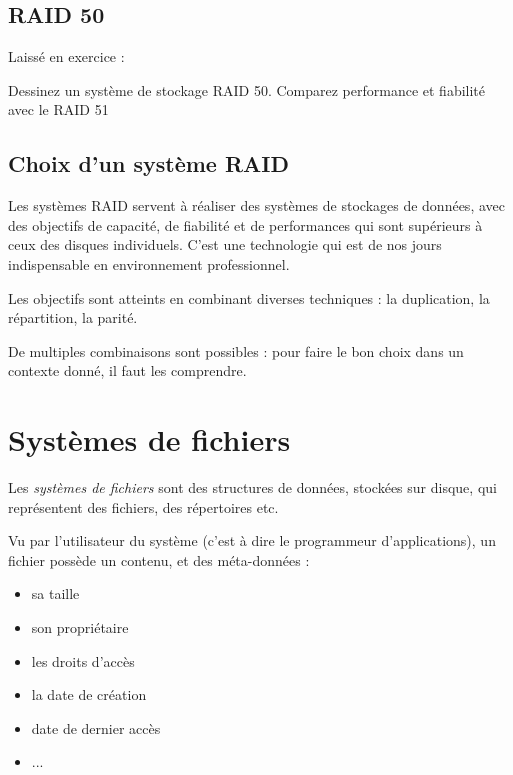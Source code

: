 \begin{multicols}{2}


\subsection{RAID 50}

Laissé en exercice :

\begin{exercice}
Dessinez un système de stockage RAID 50.
Comparez 
 performance et fiabilité avec le RAID 51
\end{exercice}

\subsection{Choix d'un système RAID}

Les systèmes RAID servent à réaliser des systèmes de stockages de
données, avec des objectifs de capacité, de fiabilité et de
performances qui sont supérieurs à ceux des disques individuels.
C'est une technologie qui est de nos jours indispensable en environnement
professionnel.

Les objectifs sont atteints en combinant diverses techniques : la
duplication, la répartition, la parité.

De multiples combinaisons sont possibles : pour faire le bon choix 
dans un contexte donné, il faut les comprendre.



\section{Systèmes de fichiers}

Les \emph{systèmes de fichiers} sont des structures de données,
stockées sur disque, qui représentent des fichiers, des répertoires
etc.

Vu par l'utilisateur du système (c'est à dire le programmeur d'applications),
un fichier possède un contenu, et des méta-données :

\begin{itemize}
\item sa taille
\item son propriétaire
\item les droits d'accès
\item la date de création
\item date de dernier accès
\item ...
\end{itemize}



\end{multicols}
